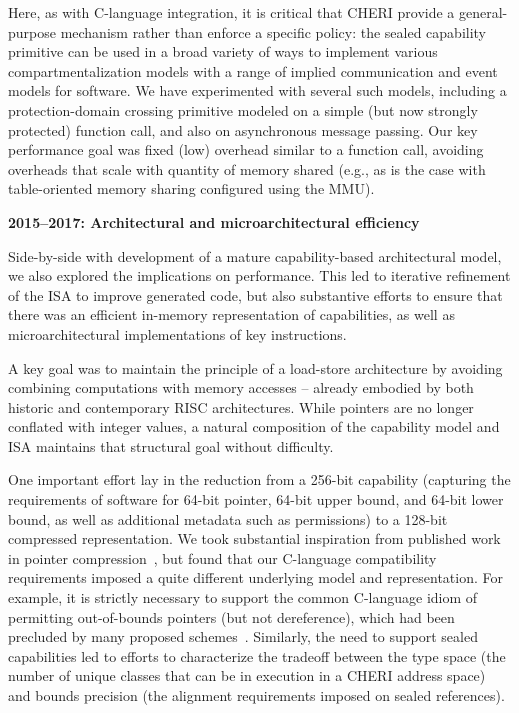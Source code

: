 Here, as with C-language integration, it is critical that CHERI provide a
general-purpose mechanism rather than enforce a specific policy: the sealed
capability primitive can be used in a broad variety of ways to implement
various compartmentalization models with a range of implied communication
and event models for software.
We have experimented with several such models, including a protection-domain
crossing primitive modeled on a simple (but now strongly protected) function
call, and also on asynchronous message passing.
Our key performance goal was fixed (low) overhead similar to a function call,
avoiding overheads that scale with quantity of memory shared (e.g., as is the
case with table-oriented memory sharing configured using the MMU).

\medskip
\noindent
\textbf{2015--2017: Architectural and microarchitectural efficiency}

\smallskip
\noindent
Side-by-side with development of a mature capability-based architectural
model, we also explored the implications on performance.
This led to iterative refinement of the ISA to improve generated code, but
also substantive efforts to ensure that there was an efficient in-memory
representation of capabilities, as well as microarchitectural implementations
of key instructions.

A key goal was to maintain the principle of a load-store architecture by
avoiding combining computations with memory accesses -- already embodied by
both historic and contemporary RISC architectures.
While pointers are no longer conflated with integer values, a natural
composition of the capability model and ISA maintains that structural goal
without difficulty.

One important effort lay in the reduction from a 256-bit capability (capturing
the requirements of software for 64-bit pointer, 64-bit upper bound, and
64-bit lower bound, as well as additional metadata such as permissions) to a
128-bit compressed representation.
We took substantial inspiration from published work in pointer
compression~\cite{kwon:lowfat}, but found that our C-language compatibility
requirements imposed a quite different underlying model and representation.
For example, it is strictly necessary to support the common C-language idiom
of permitting out-of-bounds pointers (but not dereference), which had been
precluded by many proposed
schemes~\cite{ChisnallCPDP11,Cerberus-PLDI16,davis2019:cheriabi}.
Similarly, the need to support sealed capabilities led to efforts to
characterize the tradeoff between the type space (the number of unique classes
that can be in execution in a CHERI address space) and bounds precision (the
alignment requirements imposed on sealed references).

